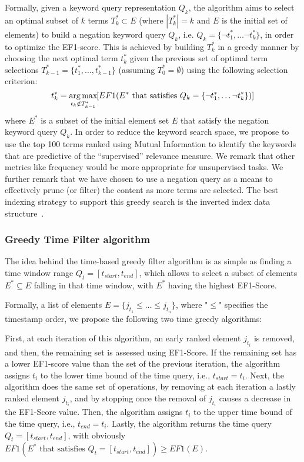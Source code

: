 Formally, given a keyword query representation $Q_k$, the algorithm aims to select an
optimal subset of $k$ terms $T_{k}^{*}\subset E$ (where $|T_{k}^{*}|=k$ and $E$ is the initial set of elements) to build a negation keyword query $Q_k$, i.e. $Q_k=\{\neg t_{1}^{*},\dots \neg t_{k}^{*}\}$, in order to optimize the EF1-score. This is achieved by
building $T_{k}^{*}$ in a greedy manner by choosing the next optimal
term $t_{k}^{*}$ given the previous set of optimal term selections
$T_{k-1}^{*}=\{t_{1}^{*},\ldots,t_{k-1}^{*}\}$ (assuming $T_{0}^{*}=\emptyset$)
using the following selection criterion:
\begin{equation}
t_{k}^{*}=\operatorname*{arg\,max}_{t_{k}\notin T_{k-1}^{*}}\hspace{-0.3mm}[EF1(E^{*} \textrm{ that satisfies } Q_k=\{\neg t_{1}^{*},\dots \neg t_{k}^{*}\})]
\end{equation}
where  $E^{*}$ is a subset of the initial element set $E$ that satisfy the negation keyword query $Q_k$. In order to reduce the keyword search space, we propose to use the top 100 terms ranked using Mutual Information to identify the keywords that are predictive of the ``supervised'' relevance measure.  We remark that other metrics like frequency would be more appropriate for unsupervised tasks.  We further remark that we have chosen to use a negation query as a means to effectively prune (or filter) the content as more terms are selected.  
The best indexing strategy to support this greedy search is the inverted index data structure~\cite{Zobel2006}.

\subsubsection{Greedy Time Filter algorithm}

The idea behind the time-based greedy filter algorithm is as simple as finding a time window range $Q_t=[t_{start},t_{end}]$, which allows to select a subset of elements $E^{*}\subseteq E$ falling in that time window, with $E^{*}$ having the highest EF1-Score.

Formally, a list of elements $E=\{j_{t_1}\leq \dots \leq j_{t_n}\}$, where "$\leq$" specifies the timestamp order, we propose the following two time greedy algorithms:

 First, at each iteration of this algorithm, an early ranked element $j_{t_i}$ is removed, and then, the remaining set is assessed using EF1-Score. If the remaining set has a lower EF1-score value than the set of the previous iteration, the algorithm assigns $t_i$ to the lower time bound of the time query, i.e., $t_{start}=t_i$. 
Next, the algorithm does the same set of operations, by removing at each iteration a lastly ranked element  $j_{t_i}$, and by stopping once the removal of  $j_{t_i}$ causes a decrease in the EF1-Score value. Then, the algorithm assigns $t_i$ to the upper time bound of the time query, i.e., $t_{end}=t_i$. 
Lastly, the algorithm returns the  time query $Q_t=[t_{start},t_{end}]$, with obviously $EF1(E^{*} \textrm{ that satisfies } Q_t=[t_{start},t_{end}]) \geq EF1(E)$.

